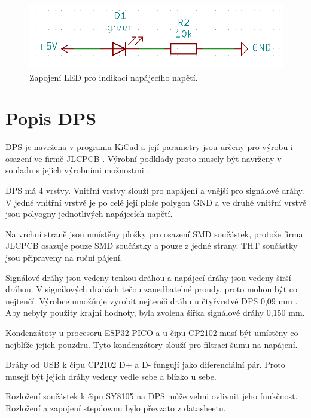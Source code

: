 \begin{figure}[!h]
  \begin{center}
    \includegraphics[scale=0.5]{obrazky/powerLED.png}
  \end{center}
  \caption[Zapojení LED pro indikaci napájecího napětí]{Zapojení LED pro indikaci napájecího napětí.}
\end{figure}

\chapter{Popis DPS}
DPS je navržena v programu KiCad a její parametry jsou určeny pro výrobu i osazení ve firmě JLCPCB \cite{JLCPCB}. Výrobní 
podklady proto musely být navrženy v souladu s jejich výrobními možnostmi \cite{JLCPCB_Capabilities}.

DPS má 4 vrstvy. Vnitřní vrstvy slouží pro napájení a vnější pro signálové dráhy. V jedné vnitřní vrstvě je po celé její ploše 
polygon GND a ve druhé vnitřní vrstvě jsou polyogny jednotlivých napájecích napětí.

Na vrchní straně jsou umístěny plošky pro osazení SMD součástek, protože firma JLCPCB osazuje pouze SMD součástky a pouze z jedné 
strany. THT součástky jsou připraveny na ruční pájení.

Signálové dráhy jsou vedeny tenkou dráhou a napájecí dráhy jsou vedeny širší dráhou. V signálových drahách tečou zanedbatelné 
proudy, proto mohou být co nejtenčí. Výrobce umožňuje vyrobit nejtenčí dráhu u čtyřvrstvé DPS 0,09 mm \cite{JLCPCB_Capabilities}. 
Aby nebyly použity krajní hodnoty, byla zvolena šířka signálové dráhy 0,150 mm.

Kondenzátoty u procesoru ESP32-PICO a u čipu CP2102 musí být umístěny co nejblíže jejich pouzdru. Tyto kondenzátory slouží pro 
filtraci šumu na napájení.

Dráhy od USB k čipu CP2102 D+ a D- fungují jako diferenciální pár. Proto musejí být jejich dráhy vedeny vedle sebe a blízko u 
sebe.

Rozložení součástek k čipu SY8105 na DPS může velmi ovlivnit jeho funkčnost. Rozložení a zapojení stepdownu 
bylo převzato z datasheetu.

